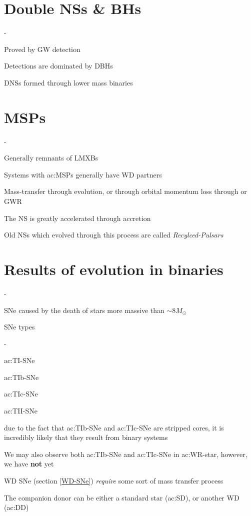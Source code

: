 \section{Double NSs \& BHs}
\begin{list}{-}{}
\item Proved by GW detection
\item Detections are dominated by DBHs 
\item DNSs formed through lower mass binaries
\end{list}

\section{MSPs}
\begin{list}{-}{}
\item Generally remnants of LMXBs
\item Systems with \gls{ac:MSP}s generally have WD partners
\item Mass-transfer through evolution, or through orbital momentum loss through or GWR
\item The NS is greatly accelerated through accretion
\item Old NSs which evolved through this process are called \textit{\gls{Recylced-Pulsar}s}
\end{list}

\section{Results of evolution in binaries}
\begin{list}{-}{}
\item SNe caused by the death of stars more massive than \(\sim8M_\odot\)
\item SNe types
\begin{list}{-}{}
\item \gls{ac:TI-SNe}
\item \gls{ac:TIb-SNe}
\item \gls{ac:TIc-SNe}
\item \gls{ac:TII-SNe} 
\end{list}
\item due to the fact that \gls{ac:TIb-SNe} and \gls{ac:TIc-SNe} are stripped cores, it is incredibly likely that they result from binary systems
\item We may also observe both \gls{ac:TIb-SNe} and \gls{ac:TIc-SNe} in \gls{ac:WR-star}, however, we have \textbf{not} yet
\item WD SNe (section \ref{WD-SNe}) \textit{require} some sort of mass transfer process
\item The companion donor can be either a standard star (\gls{ac:SD}), or another WD (\gls{ac:DD})
\end{list}

